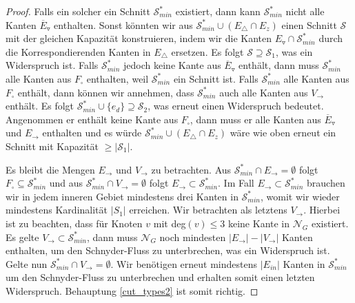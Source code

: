 \begin{proof}
Falls ein solcher ein Schnitt $\mathcal{S}_{min}^*$ existiert, dann kann $\mathcal{S}_{min}^*$ nicht alle Kanten $\overline{E}_\triangledown$ enthalten. Sonst könnten wir aus $\mathcal{S}^*_{min} \cup (E_\triangle \cap E_z)$ einen Schnitt $\mathcal{S}$ mit der gleichen Kapazität konstruieren, indem wir die Kanten $E_\triangledown \cap \mathcal{S}^*_{min}$ durch die Korrespondierenden Kanten in $E_\triangle$ ersetzen. Es folgt $\mathcal{S} \supseteq\mathcal{S}_1$, was ein Widerspruch ist. Falls $\mathcal{S}_{min}^*$ jedoch keine Kante aus $\overline{E}_\triangledown$ enthält, dann muss $\mathcal{S}_{min}^*$ alle Kanten aus $F_\square$ enthalten, weil $\mathcal{S}_{min}^*$ ein Schnitt ist. Falls $\mathcal{S}_{min}^*$ alle Kanten aus $F_\square$ enthält, dann können wir annehmen, dass $\mathcal{S}_{min}^*$ auch alle Kanten aus $V_\to$ enthält. Es folgt $\mathcal{S}^*_{min} \cup \{e_d\} \supseteq \mathcal{S}_2$, was erneut einen Widerspruch bedeutet. Angenommen er enthält keine Kante aus $F_\square$, dann muss er alle Kanten aus $\overline{E}_\triangledown$ und $E_\to$ enthalten und es würde $\mathcal{S}^*_{min} \cup (E_\triangle \cap E_z)$ wäre wie oben erneut ein Schnitt mit Kapazität $\geq |\mathcal{S}_1|$. 

Es bleibt die Mengen $E_\to$ und $V_\to$ zu betrachten. Aus $\mathcal{S}_{min}^*\cap E_\to = \emptyset $ folgt $F_\square\subseteq\mathcal{S}_{min}^*$ und aus $\mathcal{S}_{min}^*\cap V_\to = \emptyset $ folgt $E_\to \subset  \mathcal{S}_{min}^*$. Im Fall $E_\to \subset  \mathcal{S}_{min}^*$ brauchen wir in jedem inneren Gebiet mindestens drei Kanten in $\mathcal{S}_{min}^*$, womit wir wieder mindestens Kardinalität $|S_1|$ erreichen. Wir betrachten als letztens $V_\to$. Hierbei ist zu beachten, dass für Knoten $v$ mit deg$(v) \leq 3$ keine Kante in $\mathcal{N}_G$ existiert. Es gelte $V_\to \subset  \mathcal{S}_{min}^*$, dann muss $\mathcal{N}_G$ noch mindesten $|E_\to|-|V_\to|$ Kanten enthalten, um den Schnyder-Fluss zu unterbrechen, was ein Widerspruch ist. Gelte nun $\mathcal{S}_{min}^*\cap V_\to = \emptyset$. Wir benötigen erneut mindestens $|E_{in}|$ Kanten in $\mathcal{S}_{min}^*$ um den Schnyder-Fluss zu unterbrechen und erhalten somit einen letzten Widerspruch. Behauptung \ref{cut_types2} ist somit richtig.
\end{proof}

